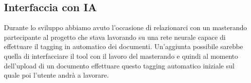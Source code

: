 \documentclass[twoside]{supsistudent}
\begin{document}
\subsection{Interfaccia con IA}

Durante lo sviluppo abbiamo avuto l'occasione di relazionarci con un 
masterando partecipante al progetto che stava lavorando su una rete neurale
capace di effettuare il tagging in automatico dei documenti. Un'aggiunta
possibile sarebbe quella di interfacciare il tool con il lavoro del masterando
e quindi al momento dell'upload di un documento effettuare questo tagging
automatico iniziale sul quale poi l'utente andrà a lavorare.

%
%
\end{document}
